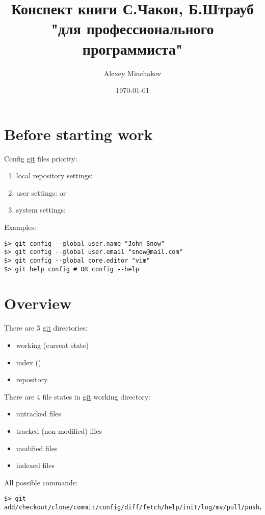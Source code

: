 \documentclass[a4paper, 12pt]{article}
\title{Конспект книги С.Чакон, Б.Штрауб "\git для профессионального программиста"}
\author{Alexey Minchakov}
\date{\today}
\newcommand{\git}{\url{git}\xspace}
\begin{document}
\maketitle

\section{Before starting work}

Config \git files priority:
\begin{enumerate}
\itemsep0em
\item local repository settings: 
\item user settings:  or 
\item system settings: 
\end{enumerate}

Examples:
\begin{lstlisting}
$> git config --global user.name "John Snow"
$> git config --global user.email "snow@mail.com"
$> git config --global core.editor "vim"
$> git help config # OR config --help
\end{lstlisting}

\section{Overview}

There are 3 \git directories:
\begin{itemize}
\item working (current state)
\item index ()
\item repository
\end{itemize}

There are 4 file states in \git working directory:
\begin{itemize}
\item untracked files
\item tracked (non-modified) files
\item modified files
\item indexed files
\end{itemize}

All possible commands:
\begin{lstlisting}
$> git add/checkout/clone/commit/config/diff/fetch/help/init/log/mv/pull/push/reset/remote/rm/status/tag
\end{lstlisting}
\end{document}
